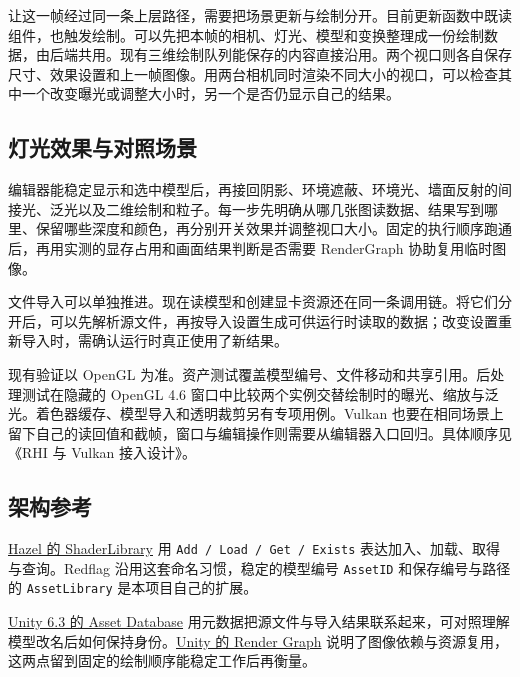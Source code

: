 \documentclass[UTF8,fontset=fandol,10pt,a4paper]{ctexart}
\newcommand{\code}[1]{{\small\texttt{#1}}}
\begin{document}
让这一帧经过同一条上层路径，需要把场景更新与绘制分开。目前更新函数中既读组件，也触发绘制。可以先把本帧的相机、灯光、模型和变换整理成一份绘制数据，由后端共用。现有三维绘制队列能保存的内容直接沿用。两个视口则各自保存尺寸、效果设置和上一帧图像。用两台相机同时渲染不同大小的视口，可以检查其中一个改变曝光或调整大小时，另一个是否仍显示自己的结果。

\subsection{灯光效果与对照场景}
编辑器能稳定显示和选中模型后，再接回阴影、环境遮蔽、环境光、墙面反射的间接光、泛光以及二维绘制和粒子。每一步先明确从哪几张图读数据、结果写到哪里、保留哪些深度和颜色，再分别开关效果并调整视口大小。固定的执行顺序跑通后，再用实测的显存占用和画面结果判断是否需要 RenderGraph 协助复用临时图像。

文件导入可以单独推进。现在读模型和创建显卡资源还在同一条调用链。将它们分开后，可以先解析源文件，再按导入设置生成可供运行时读取的数据；改变设置重新导入时，需确认运行时真正使用了新结果。

现有验证以 OpenGL 为准。资产测试覆盖模型编号、文件移动和共享引用。后处理测试在隐藏的 OpenGL 4.6 窗口中比较两个实例交替绘制时的曝光、缩放与泛光。着色器缓存、模型导入和透明裁剪另有专项用例。Vulkan 也要在相同场景上留下自己的读回值和截帧，窗口与编辑操作则需要从编辑器入口回归。具体顺序见《RHI 与 Vulkan 接入设计》。

\subsection{架构参考}
\href{https://github.com/TheCherno/Hazel/blob/master/Hazel/src/Hazel/Renderer/Shader.h}{Hazel 的 ShaderLibrary} 用 \code{Add / Load / Get / Exists} 表达加入、加载、取得与查询。Redflag 沿用这套命名习惯，稳定的模型编号 \code{AssetID} 和保存编号与路径的 \code{AssetLibrary} 是本项目自己的扩展。

\href{https://docs.unity.com/en-us/engine/6000.3/manual/assets-and-media/asset-database/contents}{Unity 6.3 的 Asset Database} 用元数据把源文件与导入结果联系起来，可对照理解模型改名后如何保持身份。\href{https://github.com/Unity-Technologies/Graphics/blob/master/Packages/com.unity.render-pipelines.core/Documentation~/render-graph-system.md}{Unity 的 Render Graph} 说明了图像依赖与资源复用，这两点留到固定的绘制顺序能稳定工作后再衡量。
\end{document}

